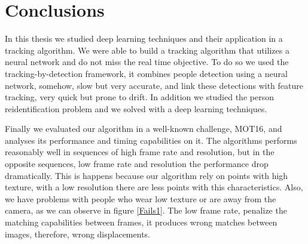 \chapter{Conclusions}\label{cap.conclusions}

 

In this thesis we studied deep learning techniques and their application in a tracking algorithm. We were able to build a tracking algorithm that utilizes a neural network and do not miss the real time objective. To do so we used the tracking-by-detection framework, it combines people detection using a neural network, somehow, slow but very accurate, and link these detections with feature tracking, very quick but prone to drift.  In addition we studied the person reidentification problem and we solved with a deep learning techniques.

Finally we evaluated our algorithm in a well-known challenge, MOT16, and analyses its performance and timing capabilities on it. The algorithms performs reasonably well in sequences of high frame rate and resolution, but in the opposite sequences, low frame rate and resolution the performance drop dramatically. This is happens because our algorithm rely on points with high texture, with a low resolution there are less points with this characteristics. Also, we have problems with people who wear low texture or are away from the camera, as we can observe in figure \ref{Fails1}. The low frame rate, penalize the matching capabilities between frames, it produces wrong matches between images, therefore, wrong displacements.




